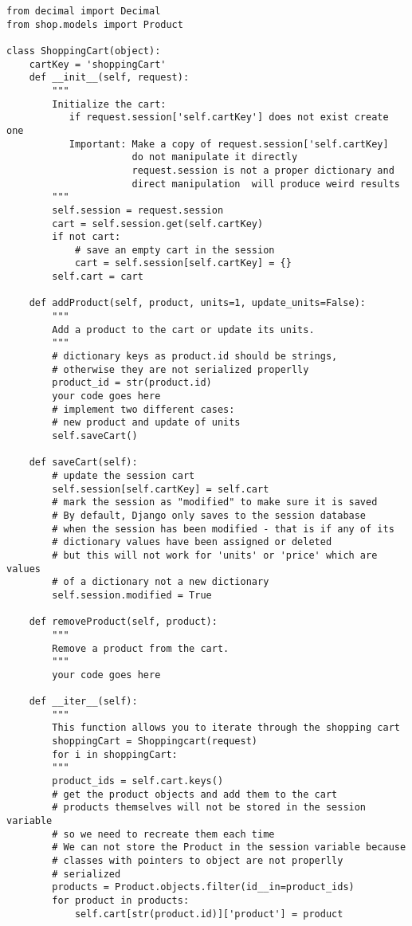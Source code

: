 \documentclass[12pt]{article} %
\begin{document}
\begin{lstlisting}
from decimal import Decimal
from shop.models import Product

class ShoppingCart(object):
    cartKey = 'shoppingCart'
    def __init__(self, request):
        """
        Initialize the cart: 
           if request.session['self.cartKey'] does not exist create one
           Important: Make a copy of request.session['self.cartKey] 
                      do not manipulate it directly
                      request.session is not a proper dictionary and 
                      direct manipulation  will produce weird results
        """
        self.session = request.session
        cart = self.session.get(self.cartKey)
        if not cart:
            # save an empty cart in the session
            cart = self.session[self.cartKey] = {}
        self.cart = cart

    def addProduct(self, product, units=1, update_units=False):
        """
        Add a product to the cart or update its units.
        """
        # dictionary keys as product.id should be strings, 
        # otherwise they are not serialized properlly
        product_id = str(product.id)
        your code goes here
        # implement two different cases:
        # new product and update of units
        self.saveCart()

    def saveCart(self):
        # update the session cart
        self.session[self.cartKey] = self.cart
        # mark the session as "modified" to make sure it is saved
        # By default, Django only saves to the session database 
        # when the session has been modified - that is if any of its 
        # dictionary values have been assigned or deleted
        # but this will not work for 'units' or 'price' which are values
        # of a dictionary not a new dictionary
        self.session.modified = True

    def removeProduct(self, product):
        """
        Remove a product from the cart.
        """
        your code goes here

    def __iter__(self):
        """
        This function allows you to iterate through the shopping cart
        shoppingCart = Shoppingcart(request)
        for i in shoppingCart:
        """
        product_ids = self.cart.keys()
        # get the product objects and add them to the cart
        # products themselves will not be stored in the session variable
        # so we need to recreate them each time
        # We can not store the Product in the session variable because
        # classes with pointers to object are not properlly
        # serialized
        products = Product.objects.filter(id__in=product_ids)
        for product in products:
            self.cart[str(product.id)]['product'] = product


\end{lstlisting}
\end{document}
